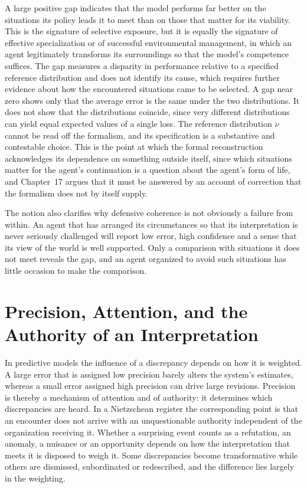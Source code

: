 A large positive gap indicates that the model performs far better on the situations its policy leads it to meet than on those that matter for its viability. This is the signature of selective exposure, but it is equally the signature of effective specialization or of successful environmental management, in which an agent legitimately transforms its surroundings so that the model's competence suffices. The gap measures a disparity in performance relative to a specified reference distribution and does not identify its cause, which requires further evidence about how the encountered situations came to be selected. A gap near zero shows only that the average error is the same under the two distributions. It does not show that the distributions coincide, since very different distributions can yield equal expected values of a single loss. The reference distribution $\nu$ cannot be read off the formalism, and its specification is a substantive and contestable choice. This is the point at which the formal reconstruction acknowledges its dependence on something outside itself, since which situations matter for the agent's continuation is a question about the agent's form of life, and Chapter~17 argues that it must be answered by an account of correction that the formalism does not by itself supply.

The notion also clarifies why defensive coherence is not obviously a failure from within. An agent that has arranged its circumstances so that its interpretation is never seriously challenged will report low error, high confidence and a sense that its view of the world is well supported. Only a comparison with situations it does not meet reveals the gap, and an agent organized to avoid such situations has little occasion to make the comparison.

\chapter{Precision, Attention, and the Authority of an Interpretation}

In predictive models the influence of a discrepancy depends on how it is weighted. A large error that is assigned low precision barely alters the system's estimates, whereas a small error assigned high precision can drive large revisions. Precision is thereby a mechanism of attention and of authority: it determines which discrepancies are heard. In a Nietzschean register the corresponding point is that an encounter does not arrive with an unquestionable authority independent of the organization receiving it. Whether a surprising event counts as a refutation, an anomaly, a nuisance or an opportunity depends on how the interpretation that meets it is disposed to weigh it. Some discrepancies become transformative while others are dismissed, subordinated or redescribed, and the difference lies largely in the weighting.

